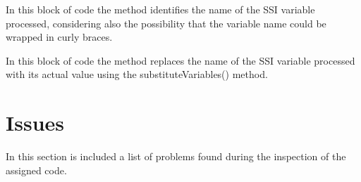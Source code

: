\documentclass[11pt,titlepage]{article} %
\begin{document}
\begin{itemize}
    In this block of code the method identifies the name of the  SSI variable processed,
    considering also the possibility that the variable name could be wrapped in curly braces.
    

    In this block of code the method replaces the name of the  SSI variable processed with its actual value using the substituteVariables() method.
    

  \end{itemize}


\section{Issues}
In this section is included a list of problems found during the inspection of the assigned code.
\end{document}
